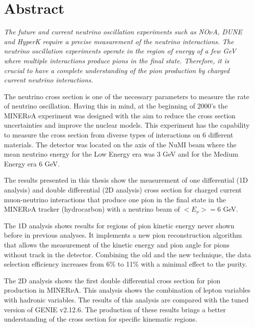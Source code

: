 \section*{Abstract}
\label{Cap:Prlg1}
\it
The future and current neutrino oscillation experiments such as NO$\nu$A\cite{NOvA}, DUNE\cite{DUNE} and HyperK\cite{HyperK} require a precise measurement of the neutrino interactions. The neutrino oscillation experiments operate in the region of energy of a few GeV where multiple interactions produce pions in the final state. Therefore, it is crucial to have a complete understanding of the pion production by charged current neutrino interactions.


The neutrino cross section is one of the necessary parameters to measure the rate of neutrino oscillation. Having this in mind, at the beginning of 2000's the MINER$\nu$A experiment was designed with the aim to reduce the cross section uncertainties and improve the nuclear models. This experiment has the capability to measure the cross section from diverse types of interactions on 6 different materials. The detector was located on the axis of the NuMI beam where the mean neutrino energy for the Low Energy era was 3 GeV and for the Medium Energy era 6 GeV. 

The results presented in this thesis show the measurement of one differential (1D analysis) and double differential (2D analysis) cross section for charged current muon-neutrino interactions that produce one pion in the final state in the MINER$\nu$A tracker (hydrocarbon) with a neutrino beam of $<E_\nu> = 6$ GeV. 

The 1D analysis shows results for regions of pion kinetic energy never shown before in previous analyses. It implements a new pion reconstruction algorithm that allows the measurement of the kinetic energy and pion angle for pions without track in the detector. Combining the old and the new technique, the data selection efficiency increases from 6\% to 11\% with a minimal effect to the purity.

The 2D analysis shows the first double differential cross section for pion production in MINER$\nu$A. This analysis shows the combination of lepton variables with hadronic variables. The results of this analysis are compared with the tuned version of GENIE v2.12.6. The production of these results brings a better understanding of the cross section for specific kinematic regions.  



\normalfont

\newpage